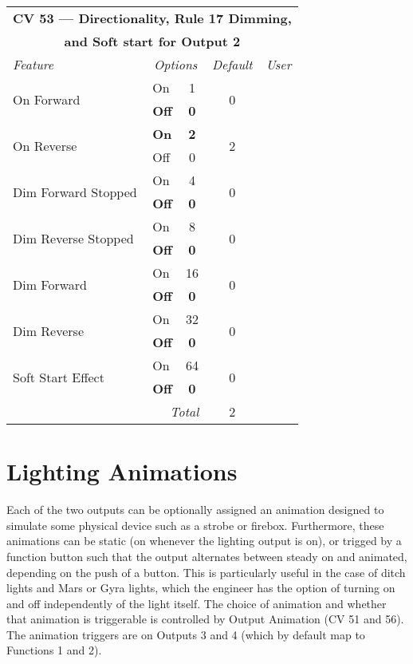 \documentclass[12pt,letterpaper,draft]{memoir} %
\begin{document}
\label{CV53}
\begin{center}
\begin{tabular}{|l|lc|c|c|}
\hline
\multicolumn{5}{|c|}{\textbf{CV 53 --- Directionality, Rule 17 Dimming,}} \\
\multicolumn{5}{|c|}{\textbf{and Soft start for Output 2}} \\ \hline \hline
\textit{Feature} & \multicolumn{2}{c|}{\textit{Options}} & \textit{Default} & \textit{User} \\ \hline
\multirow{2}{*}{On Forward}	& On			& 1 	& \multirow{2}{*}{0} 	&\\
			& \textbf{Off} 	& \textbf{0} 			& 				& \\ \hline
\multirow{2}{*}{On Reverse}	& \textbf{On}	& \textbf{2} 			& \multirow{2}{*}{2} 	&\\
			& Off 		& 0 	& 	& \\ \hline
\multirow{2}{*}{Dim Forward Stopped}		& On		& 4 			& \multirow{2}{*}{0} 	&\\
			& \textbf{Off} 	& \textbf{0} 	& 				& \\ \hline
\multirow{2}{*}{Dim Reverse Stopped}		& On			& 8 			& \multirow{2}{*}{0} 	&\\
			& \textbf{Off} 	& \textbf{0} 	& 				& \\ \hline
\multirow{2}{*}{Dim Forward}	& On			& 16 			& \multirow{2}{*}{0} 	&\\
			& \textbf{Off} 	& \textbf{0} 	& 				& \\ \hline
\multirow{2}{*}{Dim Reverse}	& On			& 32 			& \multirow{2}{*}{0} 	&\\
			& \textbf{Off} 	& \textbf{0} 	& 				& \\ \hline
\multirow{2}{*}{Soft Start Effect}	& On			& 64 			& \multirow{2}{*}{0} 	&\\
			& \textbf{Off} 	& \textbf{0} 	& 				& \\ \hline\hline

\multicolumn{3}{|r|}{\textit{Total}} & 2 &\\ \hline
\end{tabular}
\end{center}

\section{Lighting Animations}

Each of the two outputs can be optionally assigned an animation designed to simulate some physical device such as a strobe or firebox. Furthermore, these animations can be static (on whenever the lighting output is on), or trigged by a function button such that the output alternates between steady on and animated, depending on the push of a button. This is particularly useful in the case of ditch lights and Mars or Gyra lights, which the engineer has the option of turning on and off independently of the light itself. The choice of animation and whether that animation is triggerable is controlled by Output Animation (CV 51 and 56). The animation triggers are on Outputs 3 and 4 (which by default map to Functions 1 and 2).
\end{document}
